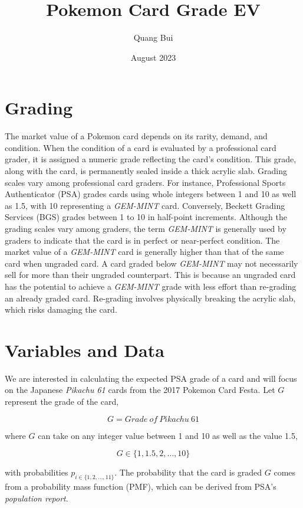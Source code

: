 \documentclass{article}
\title{Pokemon Card Grade EV}
\author{Quang Bui}
\date{August 2023}
\begin{document}
\maketitle

\section{Grading}

The market value of a Pokemon card depends on its rarity, demand, and condition. When the condition of a card is evaluated by a professional card grader, it is assigned a numeric grade reflecting the card's condition. This grade, along with the card, is permanently sealed inside a thick acrylic slab. Grading scales vary among professional card graders. For instance, Professional Sports Authenticator (PSA) grades cards using whole integers between 1 and 10 as well as 1.5, with 10 representing a \textit{GEM-MINT} card. Conversely, Beckett Grading Services (BGS) grades between 1 to 10 in half-point increments. Although the grading scales vary among graders, the term \textit{GEM-MINT} is generally used by graders to indicate that the card is in perfect or near-perfect condition. The market value of a \textit{GEM-MINT} card is generally higher than that of the same card when ungraded card. A card graded below \textit{GEM-MINT} may not necessarily sell for more than their ungraded counterpart. This is because an ungraded card has the potential to achieve a \textit{GEM-MINT} grade with less effort than re-grading an already graded card. Re-grading involves physically breaking the acrylic slab, which risks damaging the card.

\section{Variables and Data}

We are interested in calculating the expected PSA grade of a card and will focus on the Japanese \textit{Pikachu 61} cards from the 2017 Pokemon Card Festa. Let $G$ represent the grade of the card,

$$G = Grade\ of\ Pikachu\ 61$$

where $G$ can take on any integer value between 1 and 10 as well as the value 1.5,

$$G \in \{1, 1.5, 2, \ldots, 10\}$$

with probabilities $p_{i \in \{1, 2, \dots, 11\}}$. The probability that the card is graded $G$ comes from a probability mass function (PMF), which can be derived from PSA's \textit{population report}.
\end{document}
